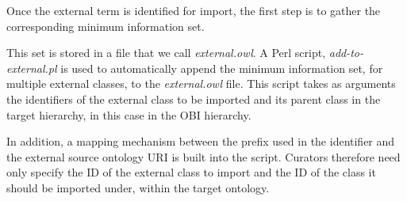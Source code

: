 \documentclass[a4paper,10pt,twocolumn]{article}
\newcommand{\protege}{Prot\'{e}g\'{e}}
\begin{document}



Once the external term is identified for import, the first step is to gather the corresponding minimum information set.

This set is stored in a file that we call \emph{external.owl}.
A Perl script, \emph{add-to-external.pl} is used to automatically append the minimum information set, for multiple external classes, to the \emph{external.owl} file. 
This script takes as arguments the identifiers of the external class to be imported and its parent class in the target hierarchy, in this case in the \ac{OBI} hierarchy. 


In addition, a mapping mechanism between the prefix used in the identifier and the external source ontology URI is built into the script.
Curators therefore need only specify the ID of the external class to import and the ID of the class it should be imported under, within the target ontology.


\end{document}
